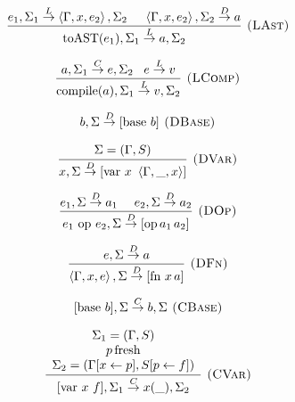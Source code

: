 \documentclass[english]{llncs}
\begin{document}
\begin{figure}[t]
\begin{minipage}[t]{0.59\columnwidth}
{\footnotesize{}
\[
\frac{e_{1},\Sigma_{1}\overset{L}{\rightarrow}\left\langle \Gamma,x,e_{2}\right\rangle ,\Sigma_{2}\,\,\,\,\,\,\,\,\left\langle \Gamma,x,e_{2}\right\rangle ,\Sigma_{2}\overset{D}{\rightarrow}a}{\mbox{toAST(\ensuremath{e_{1}})},\Sigma_{1}\overset{L}{\rightarrow}a,\Sigma_{2}}\textsc{ (LAst)}
\]
}{\footnotesize \par}

{\footnotesize{}
\[
\frac{a,\Sigma_{1}\overset{C}{\rightarrow}e,\Sigma_{2}\,\,\,\,\, e\overset{L}{\rightarrow}v}{\mbox{compile(\ensuremath{a})},\Sigma_{1}\overset{L}{\rightarrow}v,\Sigma_{2}}\textsc{ (LComp)}
\]
}%
\end{minipage}{\footnotesize{}}%
\begin{minipage}[t]{0.4\columnwidth}%
{\footnotesize{}
\[
b,\Sigma\overset{D}{\rightarrow}[\mbox{base }b]\textsc{ (DBase)}
\]
}{\footnotesize \par}

{\footnotesize{}
\[
\frac{\begin{array}[t]{c}
\Sigma=(\Gamma,S)\end{array}}{x,\Sigma\overset{D}{\rightarrow}[\mbox{var}\ x\ \left\langle \Gamma,\_,x\right\rangle ]}\textsc{ (DVar)}
\]
}{\footnotesize \par}

{\footnotesize{}
\[
\frac{e_{1},\Sigma\overset{D}{\rightarrow}a_{1}\,\,\,\,\,\,\,\, e_{2},\Sigma\overset{D}{\rightarrow}a_{2}}{e_{1}\mbox{ op }e_{2},\Sigma\overset{D}{\rightarrow}[\mbox{op\,\ensuremath{a_{1}\,}\ensuremath{a_{2}}}]}\textsc{ (DOp)}
\]
}{\footnotesize \par}

{\footnotesize{}
\[
\frac{e,\Sigma\overset{D}{\rightarrow}a}{\left\langle \Gamma,x,e\right\rangle ,\Sigma\overset{D}{\rightarrow}[\mbox{fn }x\, a]}\textsc{ (DFn)}
\]
}{\footnotesize \par}

{\footnotesize{}
\[
[\mbox{base \ensuremath{b}}],\Sigma\overset{C}{\rightarrow}b,\Sigma\textsc{ (CBase)}
\]
}{\footnotesize \par}

{\footnotesize{}
\[
\frac{\begin{array}[t]{c}
\Sigma_{1}=(\Gamma,S)\\
p\,\mbox{fresh}\\
\Sigma_{2}=(\Gamma[x\leftarrow p],S[p\leftarrow f])
\end{array}}{[\mbox{var}\ x\ f],\Sigma_{1}\overset{C}{\rightarrow}x(\_),\Sigma_{2}}\textsc{ (CVar)}
\]
}{\footnotesize \par}


\end{minipage}
\end{figure}
\end{document}
